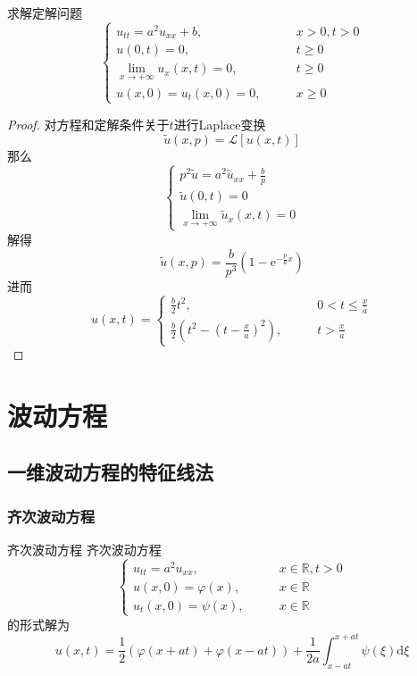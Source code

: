 \documentclass[lang = cn, scheme = chinese, thmcnt = section]{elegantbook}
\newcommand{\R}{\mathbb{R}}            %
\newcommand{\dd}{\mathrm{d}}           %
\newcommand{\ee}[1]{\mathrm{e}^{#1}}   %
\newcommand{\dis}{\displaystyle}
\begin{document}
\begin{example}
	求解定解问题
	$$
	\begin{cases}
		u_{tt}=a^2u_{xx}+b,\qquad & x>0,t>0\\
		u(0,t)=0,\qquad & t\ge 0\\
		\lim\limits_{x\to+\infty}u_x(x,t)=0,\qquad & t\ge 0\\
		u(x,0)=u_t(x,0)=0,\qquad & x\ge 0
	\end{cases}
	$$
\end{example}

\begin{proof}
	对方程和定解条件关于$t$进行Laplace变换%
	$$
	\tilde{u}(x,p)=\mathscr{L}[u(x,t)]
	$$
	那么%
	$$
	\begin{cases}
		p^2\tilde{u}=a^2\tilde{u}_{xx}+\frac{b}{p}\\
		\tilde{u}(0,t)=0\\
		\lim\limits_{x\to+\infty}\tilde{u}_x(x,t)=0
	\end{cases}
	$$
	解得%
	$$
	\tilde{u}(x,p)=\frac{b}{p^3}\left(1-\ee{-\frac{p}{a}x}\right)
	$$
	进而%
	$$
	u(x,t)=\begin{cases}
		\dis\frac{b}{2}t^2,\qquad & \dis0<t\le\frac{x}{a}\\
		\dis\frac{b}{2}\left(t^2-\left(t-\frac{x}{a}\right)^2\right),\qquad & \dis t>\frac{x}{a}
	\end{cases}
	$$
\end{proof}

\chapter{波动方程}

\section{一维波动方程的特征线法}

\subsection{齐次波动方程}

\begin{theorem}{齐次波动方程}
	齐次波动方程
	$$
	\begin{cases}
		u_{tt}=a^2u_{xx},\qquad & x\in \R,t>0\\
		u(x,0)=\varphi(x),\qquad & x\in \R\\
		u_t(x,0)=\psi(x),\qquad & x\in \R
	\end{cases}
	$$
	的形式解为
	$$
	u(x,t)=\frac{1}{2}(\varphi(x+at)+\varphi(x-at))+\frac{1}{2a}\int_{x-at}^{x+at}\psi(\xi)\dd\xi
	$$
\end{theorem}
\end{document}
